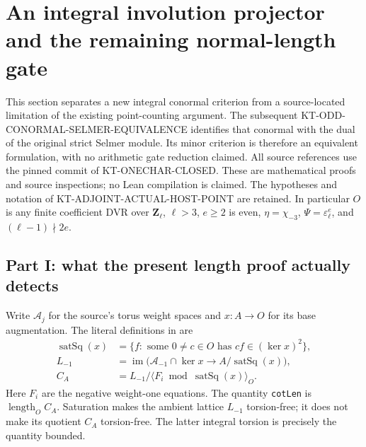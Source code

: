 \documentclass[11pt,a4paper]{article}
\theoremstyle{definition}
\begin{document}


\section{An integral involution projector and the remaining normal-length gate}
\label{sec:kt-projector}

This section separates a new integral conormal criterion from a
source-located limitation of the existing point-counting argument.
The subsequent KT-ODD-CONORMAL-SELMER-EQUIVALENCE identifies
that conormal with the dual of the original strict Selmer
module.  Its minor criterion is therefore an equivalent
formulation, with no arithmetic gate reduction claimed.
All source references use the pinned commit of KT-ONECHAR-CLOSED.
These are mathematical proofs and source inspections; no Lean
compilation is claimed.  The hypotheses and notation of
KT-ADJOINT-ACTUAL-HOST-POINT are retained.  In particular $O$ is
any finite coefficient DVR over $\mathbf Z_\ell$, $\ell>3$,
$e\geq2$ is even, $\eta=\chi_{-3}$, $\Psi=\varepsilon_\ell^e$,
and $(\ell-1)\nmid2e$.

\subsection{Part I: what the present length proof actually detects}

Write $\mathcal A_j$ for the source's torus weight spaces and
$x:A\to O$ for its base augmentation.  The literal definitions in
 are
\[
 \begin{split}
 \operatorname{satSq}(x)
   &=\{f:\text{ some }0\ne c\in O\text{ has }cf\in(\ker x)^2\},\\
 L_{-1}&=\operatorname{im}\bigl(\mathcal A_{-1}\cap\ker x
                     \longrightarrow A/\operatorname{satSq}(x)\bigr),\\
 C_A&=L_{-1}/\langle F_i\bmod\operatorname{satSq}(x)\rangle_O.
 \end{split}                                                    \tag{KP.1}
\]
Here $F_i$ are the negative weight-one equations.  The quantity
\texttt{cotLen} is $\operatorname{length}_O C_A$.  Saturation
makes the ambient lattice $L_{-1}$ torsion-free; it does not make
its quotient $C_A$ torsion-free.  The latter integral torsion is
precisely the quantity bounded.
\end{document}

